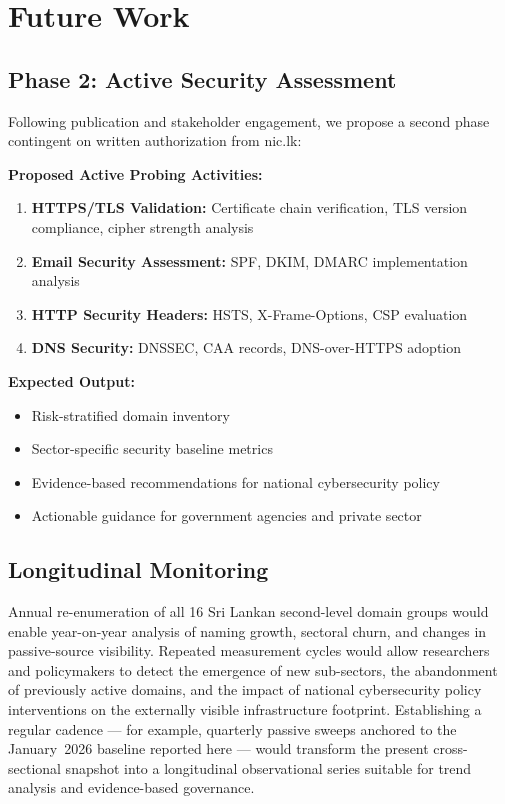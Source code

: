 \documentclass[preprint,review,12pt]{elsarticle}
\begin{document}
\section{Future Work}
\label{sec:future}

\subsection{Phase 2: Active Security Assessment}

Following publication and stakeholder engagement, we propose a second phase contingent on written authorization from nic.lk:

\textbf{Proposed Active Probing Activities:}
\begin{enumerate}
    \item \textbf{HTTPS/TLS Validation:} Certificate chain verification, TLS version compliance, cipher strength analysis
    \item \textbf{Email Security Assessment:} SPF, DKIM, DMARC implementation analysis
    \item \textbf{HTTP Security Headers:} HSTS, X-Frame-Options, CSP evaluation
    \item \textbf{DNS Security:} DNSSEC, CAA records, DNS-over-HTTPS adoption
\end{enumerate}

\textbf{Expected Output:}
\begin{itemize}
    \item Risk-stratified domain inventory
    \item Sector-specific security baseline metrics
    \item Evidence-based recommendations for national cybersecurity policy
    \item Actionable guidance for government agencies and private sector
\end{itemize}

\subsection{Longitudinal Monitoring}

Annual re-enumeration of all 16 Sri Lankan second-level domain groups would enable year-on-year analysis of naming growth, sectoral churn, and changes in passive-source visibility. Repeated measurement cycles would allow researchers and policymakers to detect the emergence of new sub-sectors, the abandonment of previously active domains, and the impact of national cybersecurity policy interventions on the externally visible infrastructure footprint. Establishing a regular cadence --- for example, quarterly passive sweeps anchored to the January~2026 baseline reported here --- would transform the present cross-sectional snapshot into a longitudinal observational series suitable for trend analysis and evidence-based governance.
\end{document}
